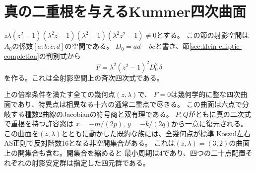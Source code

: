 \section{真の二重根を与えるKummer四次曲面}
\label{sec:kummer-ramification}
$z\lambda(z^2-1)(\lambda^2z-1)(\lambda^2-1)(\lambda^2z^2-1)\ne0$とする。
この節の射影空間は$A_0$の係数$[a:b:c:d]$の空間である。
$D_0=ad-bc$と書き、節\ref{sec:klein-elliptic-completion}の判別式から
\[
 F=\lambda^2(z^2-1)^2D_0^2\,\delta
\]
を作る。これは全射影空間上の斉次四次式である。
\begin{theorem}\label{thm:kummer-ramification}
上の倍率条件を満たす全ての幾何点$(z,\lambda)$で、
$F=0$は幾何学的に整な四次曲面であり、特異点は相異なる十六の通常二重点で尽きる。
この曲面は六点で分岐する種数2曲線のJacobianの符号商と双有理である。
$P,Q$がともに真の二次式で重根を持つ許容窓は
$x=-m/(2p)$, $y=-k/(2q)$から一意に復元される。
この曲面を$(z,\lambda)$とともに動かした既約な族には、全幾何点が標準
Koszul左右AS正則で反対階数16となる非空開集合がある。
これは$(z,\lambda)=(3,2)$の曲面上の開集合も含む。開集合を縮めると
最小周期は4であり、四つの二十点配置それぞれの射影安定群は指定した四元群である。
\end{theorem}
